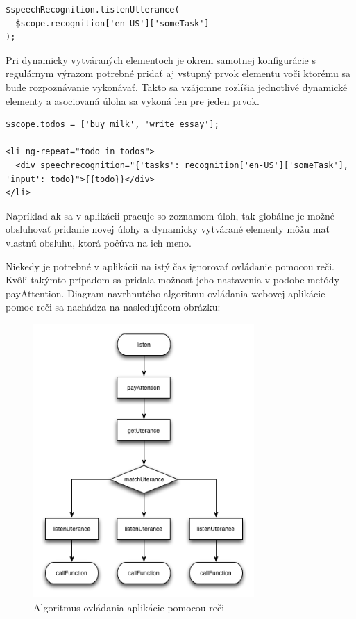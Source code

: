 \begin{lstlisting}
$speechRecognition.listenUtterance(
  $scope.recognition['en-US']['someTask']
);
\end{lstlisting}

Pri dynamicky vytváraných elementoch je okrem samotnej konfigurácie s regulárnym výrazom potrebné pridať aj vstupný prvok elementu voči ktorému sa bude rozpoznávanie vykonávať. Takto sa vzájomne rozlíšia jednotlivé dynamické elementy a asociovaná úloha sa vykoná len pre jeden prvok.

\begin{lstlisting}
$scope.todos = ['buy milk', 'write essay'];

<li ng-repeat="todo in todos">
  <div speechrecognition="{'tasks': recognition['en-US']['someTask'], 'input': todo}">{{todo}}</div>
</li>
\end{lstlisting}

Napríklad ak sa v aplikácii pracuje so zoznamom úloh, tak globálne je možné obsluhovať pridanie novej úlohy a dynamicky vytvárané elementy môžu mať vlastnú obsluhu, ktorá počúva na ich meno. 

Niekedy je potrebné v aplikácii na istý čas ignorovať ovládanie pomocou reči. Kvôli takýmto prípadom sa pridala možnosť jeho nastavenia v podobe metódy payAttention. Diagram navrhnutého algoritmu ovládania webovej aplikácie pomoc reči sa nachádza na nasledujúcom obrázku:

\begin{figure}[H]
  \centering
  \includegraphics[width=0.75\textwidth]{diagram/speech.png}
  \caption[Algoritmus ovládania aplikácie pomocou reči]{
    Algoritmus ovládania aplikácie pomocou reči}
  \label{fig: diaspeech}
\end{figure}


